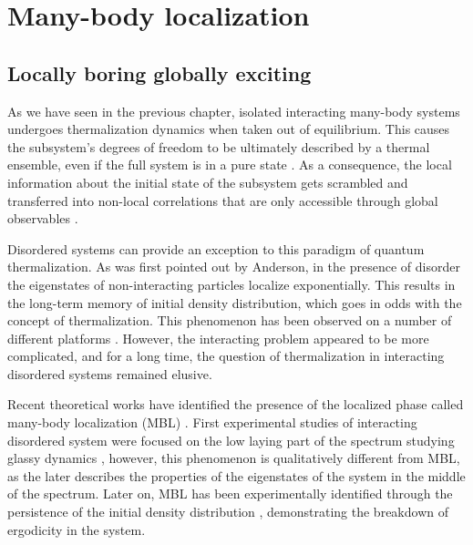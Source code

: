 
\chapter{Many-body localization}

\section{Locally boring globally exciting}
As we have seen in the previous chapter, isolated interacting many-body systems undergoes thermalization dynamics when taken out of equilibrium. This causes the subsystem's degrees of freedom to be ultimately described by a thermal ensemble, even if the full system is in a pure state \cite{Deutsch1991, Srednicki1994, Rigol2008}. As a consequence, the local information about the initial state of the subsystem gets scrambled and transferred into non-local correlations that are only accessible through global observables \cite{Neill2016, Kaufman2016, Nandkishore2015}. 

Disordered systems can provide an exception to this paradigm of quantum thermalization. As was first pointed out by Anderson, in the presence of disorder the eigenstates of non-interacting particles localize exponentially\cite{Anderson1958}. This results in the long-term memory of initial density distribution, which goes in odds with the concept of thermalization. This phenomenon has been observed on a number of different platforms \cite{Wiersma1997,  Schwartz2007, Billy2008, Roati2008, Lahini2008,Gadway2011, Kondov2011}. However, the interacting problem appeared to be more complicated, and for a long time, the question of thermalization in interacting disordered systems remained elusive. 

Recent theoretical works have identified the presence of the localized phase called many-body localization (MBL) \cite{Nandkishore2015, Gornyi2005, Basko2006, Oganesyan2007, Imbrie2016, Altman2015, Abanin2018}. First experimental studies of interacting disordered system were focused on the low laying part of the spectrum studying glassy dynamics \cite{Jendrzejewski2012, DErrico2014, Kondov2015, Semeghini2015}, however, this phenomenon is qualitatively different from MBL, as the later describes the properties of the eigenstates of the system in the middle of the spectrum.  Later on, MBL has been experimentally identified through the persistence of the initial density distribution \cite{Schreiber2015, Smith2015, Bordia2016, Choi2016, Lueschen2017, Bordia2017}, demonstrating the breakdown of ergodicity in the system. 

